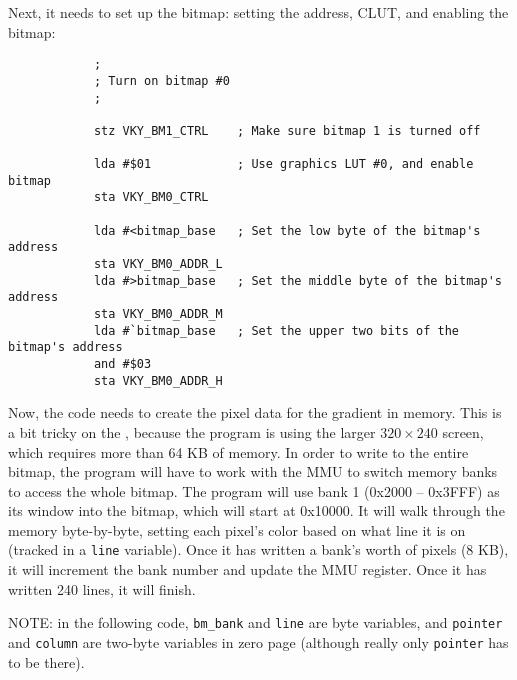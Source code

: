 Next, it needs to set up the bitmap: setting the address, CLUT, and enabling the bitmap:

\begin{verbatim}
            ;
            ; Turn on bitmap #0
            ;

            stz VKY_BM1_CTRL    ; Make sure bitmap 1 is turned off

            lda #$01            ; Use graphics LUT #0, and enable bitmap
            sta VKY_BM0_CTRL

            lda #<bitmap_base   ; Set the low byte of the bitmap's address
            sta VKY_BM0_ADDR_L
            lda #>bitmap_base   ; Set the middle byte of the bitmap's address
            sta VKY_BM0_ADDR_M
            lda #`bitmap_base   ; Set the upper two bits of the bitmap's address
            and #$03
            sta VKY_BM0_ADDR_H
\end{verbatim}

Now, the code needs to create the pixel data for the gradient in memory. This is a bit tricky on the \jr, because the program is using the larger $320 \times 240$ screen, which requires more than 64 KB of memory. In order to write to the entire bitmap, the program will have to work with the MMU to switch memory banks to access the whole bitmap. The program will use bank 1 (0x2000 -- 0x3FFF) as its window into the bitmap, which will start at 0x10000. It will walk through the memory byte-by-byte, setting each pixel's color based on what line it is on (tracked in a \verb+line+ variable). Once it has written a bank's worth of pixels (8 KB), it will increment the bank number and update the MMU register. Once it has written 240 lines, it will finish.

NOTE: in the following code, \verb+bm_bank+ and \verb+line+ are byte variables, and \verb+pointer+ and \verb+column+ are two-byte variables in zero page (although really only \verb+pointer+ has to be there).

